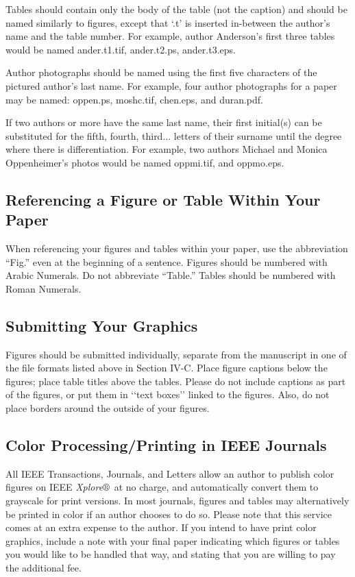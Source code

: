 \documentclass{ieeeaccess}
\begin{document}
Tables should contain only the body of the table (not the caption) and
should be named similarly to figures, except that `.t' is inserted
in-between the author's name and the table number. For example, author
Anderson's first three tables would be named ander.t1.tif, ander.t2.ps,
ander.t3.eps.

Author photographs should be named using the first five characters of the
pictured author's last name. For example, four author photographs for a
paper may be named: oppen.ps, moshc.tif, chen.eps, and duran.pdf.

If two authors or more have the same last name, their first initial(s) can
be substituted for the fifth, fourth, third$\ldots$ letters of their surname
until the degree where there is differentiation. For example, two authors
Michael and Monica Oppenheimer's photos would be named oppmi.tif, and
oppmo.eps.

\subsection{Referencing a Figure or Table Within Your Paper}
When referencing your figures and tables within your paper, use the
abbreviation ``Fig.'' even at the beginning of a sentence. Figures should be numbered with Arabic Numerals.
Do not abbreviate ``Table.'' Tables should be numbered with Roman Numerals.

\subsection{Submitting Your Graphics}
Figures should be submitted individually, separate from the manuscript in one of the file formats listed above in Section IV-C. Place figure captions below the figures; place table titles above the tables. Please do not include captions as part of the figures, or put them in ‘‘text boxes’’ linked to the figures. Also, do not place borders around the outside of your figures.

\subsection{Color Processing/Printing in IEEE Journals}
All IEEE Transactions, Journals, and Letters allow an author to publish
color figures on IEEE {\it Xplore}$\circledR$\ at no charge, and automatically
convert them to grayscale for print versions. In most journals, figures and
tables may alternatively be printed in color if an author chooses to do so.
Please note that this service comes at an extra expense to the author. If
you intend to have print color graphics, include a note with your final
paper indicating which figures or tables you would like to be handled that
way, and stating that you are willing to pay the additional fee.
\end{document}
